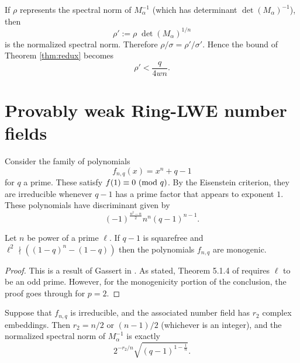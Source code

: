 \documentclass{llncs}
\newcommand{\MOD}[1]{~(\textup{mod}~#1)}
\renewcommand{\pmod}{\MOD}
\newcommand{\<}{\langle}
\renewcommand{\>}{\rangle}
\begin{document}
If $\rho$ represents the spectral norm of $M_\alpha^{-1}$ (which has determinant $\det(M_\alpha)^{-1}$), then
\[
        \rho' := \rho \; {\det(M_\alpha)}^{1/n}
\]
is the normalized spectral norm.  Therefore $\rho/\sigma = \rho'/\sigma'$.  Hence the bound of Theorem \ref{thm:redux} becomes
\begin{equation}
        \label{eqn:rhoprime}
        \rho' < \frac{q}{4 w {n}}.
\end{equation}



\section{Provably weak Ring-LWE number fields}
\label{sec:provable}


        Consider the family of polynomials
        \[
                f_{n,q}(x) =  x^{n} + q-1
        \]
        for $q$ a prime.  These satisfy $f(1) \equiv 0 \pmod q$.  By the Eisenstein criterion, they are irreducible whenever $q-1$ has a prime factor that appears to exponent $1$.  These polynomials have discriminant \cite{Masser} given by
        \[
 (-1)^{\frac{n^2-n}{2}}n^n(q-1)^{n-1}.
        \]

        \begin{proposition}
                \label{prop:family1}
              Let $n$ be power of a prime $\ell$.  If $q-1$ is squarefree and $\ell^2 \nmid ((1-q)^n-(1-q))$ then the polynomials $f_{n,q}$ are monogenic.
        \end{proposition}

        \begin{proof}
                This is a result of Gassert in \cite[Theorem 5.1.4]{Gassert}.  As stated, Theorem 5.1.4 of \cite{Gassert} requires $\ell$ to be an odd prime.  However, for the monogenicity portion of the conclusion, the proof goes through for $p=2$.
        \end{proof}

        \begin{proposition}
                \label{prop:family2}
                Suppose that $f_{n,q}$ is irreducible, and the associated number field has $r_2$ complex embeddings.  Then $r_2 = n/2$ or $(n-1)/2$ (whichever is an integer), and the normalized spectral norm of $M_\alpha^{-1}$ is exactly
                \[
                        2^{-r_2/n}\sqrt{(q-1)^{1-\frac{1}{n}}}.
        \]
        \end{proposition}
\end{document}
